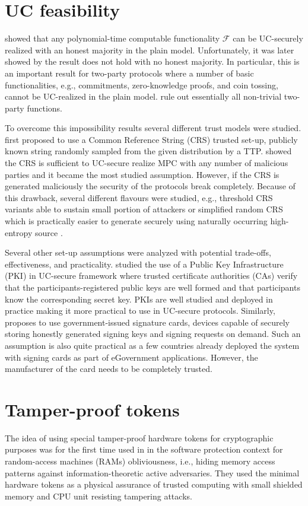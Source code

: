 \documentclass[
  digital, %
  twoside, %
  table,   %
  lof,     %
  lot,     %
]{fithesis3}
\newcounter{ph4_show_guides}
\theoremstyle{definition}
\theoremstyle{remark}
\begin{document}
\section{UC feasibility}\label{sec:soa:uc_feasibility}
\cite{Can01} showed that any polynomial-time computable functionality $\mathcal{F}$ can be UC-securely realized with an honest majority in the plain model. Unfortunately, it was later showed by \cite{CF01} the result does not hold with no honest majority. In particular, this is an important result for two-party protocols where a number of basic functionalities, e.g., commitments, zero-knowledge proofs, and coin tossing, cannot be UC-realized in the plain model. \cite{Lin03, CKL04, CKL06} rule out essentially all non-trivial two-party functions.

To overcome this impossibility results several different trust models were studied. 
\cite{CF01} first proposed to use a Common Reference String (CRS) trusted set-up, publicly known string randomly sampled from the given distribution by a TTP. \cite{CLOS02} showed the CRS is sufficient to UC-secure realize MPC with any number of malicious parties and it became the most studied assumption. However, if the CRS is generated maliciously the security of the protocols break completely. Because of this drawback, several different flavours were studied, e.g., threshold CRS variants able to sustain small portion of attackers or simplified random CRS which is practically easier to generate securely using naturally occurring high-entropy source \cite{CPS07}.

Several other set-up assumptions were analyzed with potential trade-offs, effectiveness, and practicality. \cite{BCNP04} studied the use of a Public Key Infrastructure (PKI) in UC-secure framework where trusted certificate authorities (CAs) verify that the participants-registered public keys are well formed and that participants know the corresponding secret key. PKIs are well studied and deployed in practice making it more practical to use in UC-secure protocols. Similarly, \cite{HUU07} proposes to use government-issued signature cards, devices capable of securely storing honestly generated signing keys and signing requests on demand. Such an assumption is also quite practical as a few countries already deployed the system with signing cards as part of eGovernment applications. However, the manufacturer of the card needs to be completely trusted.

\section{Tamper-proof tokens}\label{sec:soa:tokens}
The idea of using special tamper-proof hardware tokens for cryptographic purposes was for the first time used in \cite{GO96} in the software protection context for random-access machines (RAMs) obliviousness, i.e., hiding memory access patterns against information-theoretic active adversaries. They used the minimal hardware tokens as a physical assurance of trusted computing with small shielded memory and CPU unit resisting tampering attacks.
\end{document}

